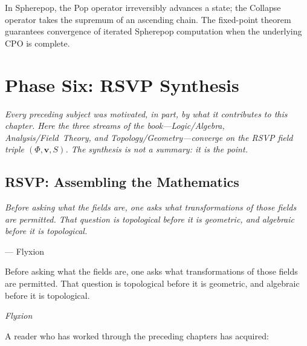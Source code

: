\documentclass[12pt, twoside, openright, a4paper]{book}
\newcommand{\chapterepigraph}[2]{%
  \vspace{-8pt}\begin{center}\begin{minipage}{0.78\textwidth}
  \small\itshape #1\begin{flushright}--- #2\end{flushright}
  \end{minipage}\end{center}\vspace{10pt}}
\newcommand{\partintro}[1]{%
  \begin{tcolorbox}[enhanced, colback=RSVPdeep, colframe=RSVPdeep, coltext=white,
    arc=6pt, boxrule=0pt, left=8mm, right=8mm, top=6mm, bottom=6mm]
  \large\itshape #1\end{tcolorbox}}
\begin{document}
In Spherepop, the Pop operator irreversibly advances a state; the Collapse operator takes the supremum of an ascending chain.
The fixed-point theorem guarantees convergence of iterated Spherepop computation when the underlying CPO is complete.

\part{Phase Six: RSVP Synthesis}

\partintro{Every preceding subject was motivated, in part, by what it
contributes to this chapter. Here the three streams of the
book---Logic/Algebra, Analysis/Field~Theory, and Topology/Geometry---converge
on the RSVP field triple $(\Phi, \mathbf{v}, S)$. The synthesis is not a
summary: it is the point.}

\chapter{RSVP: Assembling the Mathematics}
\chapterepigraph{Before asking what the fields are, one asks what transformations
of those fields are permitted. That question is topological before it is geometric,
and algebraic before it is topological.}{Flyxion}
\label{ch:rsvp}

\epigraph{Before asking what the fields are, one asks what transformations of those fields are permitted.
That question is topological before it is geometric, and algebraic before it is topological.}{\textit{Flyxion}}

A reader who has worked through the preceding chapters has acquired:
\end{document}
